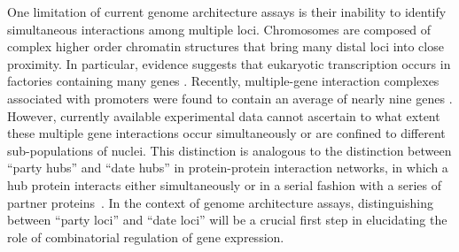 One limitation of current genome architecture assays is their
inability to identify simultaneous interactions among multiple
loci. Chromosomes are composed of complex higher order chromatin
structures that bring many distal loci into close proximity.  In
particular, evidence suggests that eukaryotic transcription occurs in
factories containing many genes \cite{cook:organization}.
Recently, multiple-gene
interaction complexes associated with promoters were found to contain
an average of nearly nine genes \cite{li:extensive}. However, currently
available experimental data cannot ascertain to what extent these
multiple gene interactions occur simultaneously or are confined to
different sub-populations of nuclei. This distinction is analogous to
the distinction between ``party hubs'' and ``date hubs'' in
protein-protein interaction networks, in which a hub protein interacts
either simultaneously or in a serial fashion with a series of partner
proteins~\cite{han:evidence}. In the context of genome architecture assays,
distinguishing between ``party loci'' and ``date loci'' will be a
crucial first step in elucidating the role of combinatorial regulation
of gene expression.

